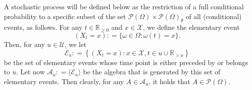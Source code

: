 \documentclass[10pt,a4paper]{paper}
\theoremstyle{definition}
\newcommand{\nats}{\mathbb{N}}
\newcommand{\reals}{\mathbb{R}}
\newcommand{\realsnonneg}{\reals_{\geq 0}}
\newcommand{\states}{\mathcal{X}}
\newcommand{\paths}{\Omega}
\newcommand{\power}{\mathcal{P}(\paths)}
\newcommand{\nonemptypower}{\power_{\emptyset}}
\newcommand{\events}{\mathcal{E}}
\newcommand{\filter}[1][t]{\mathcal{F}_{#1}}
\newcommand{\coloneqq}{:\!=}
\begin{document}
A stochastic process will be defined below as the restriction of a full conditional probability to a specific subset of the set $\power\times\nonemptypower$ of all (conditional) events, as follows. For any $t\in\realsnonneg$ and $x\in\states$, we define the elementary event
\begin{equation*}
(X_t=x)\coloneqq\{\omega\in\paths\colon\omega(t)=x\}.
\end{equation*}
%
%
Then, for any $u\in\mathcal{U}$, we let
\begin{equation*}
\mathcal{E}_u \coloneqq \left\{
(X_t=x)
\colon
x\in\states,t\in u\cup\reals_{>u}
\right\}
\end{equation*}
be the set of elementary events whose time point is either preceded by or belongs to $u$. Let now $\mathcal{A}_u\coloneqq\langle\mathcal{E}_u\rangle$ be the algebra that is generated by this set of elementary events. Then clearly, for any $A\in\mathcal{A}_u$, it holds that $A\in\power$.
\end{document}
